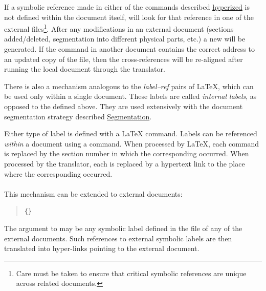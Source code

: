 \begin{changebar}%
If a symbolic reference made in either of the commands described
\hyperref{on the previous page}{in Section~}{}{hyperized} is not 
defined within the document itself,
\latextohtml{} will look for that reference in one of the external
files\footnote{Care must be taken to ensure that critical symbolic
references are unique across related documents.}.
After any modifications in an external document 
(sections added/deleted, segmentation into different physical parts, etc.) 
a new  will be generated.  
If the  command in another 
document contains the correct address to an updated copy of
the  file, then the cross-references will be re-aligned
after running the local document through the translator.

\label{internallabels}\html{\\}%
There is also a mechanism analogous to the
\textit{label--ref} pairs of \LaTeX, which can be used only 
within a single document. 
These labels are called \textit{internal labels},
as opposed to the  defined above.
They are used extensively with the document segmentation strategy
described \hyperref{later}{in Section~}{}{Segmentation}.

Either type of label is defined with a \LaTeX{}  command.  
Labels can be referenced \textit{within} a document using a  command.
When processed by \LaTeX, each  command is replaced by the 
section number in which the corresponding  occurred.
When processed by the translator, each  is replaced by 
a hypertext link to the place where the corresponding  occurred.%
\end{changebar}%
 

%
%
\paragraph*{\label{externref}}
\begin{changebar}%
This mechanism can be extended to external documents:
\begin{quote}
\begin{small}
\verb|{|\verb|}|
\end{small}
\end{quote}
The argument to  may be any symbolic label defined 
in the  file of any of the external documents.
Such references to external symbolic labels are then translated
into hyper-links pointing to the external document.%
\end{changebar}%


